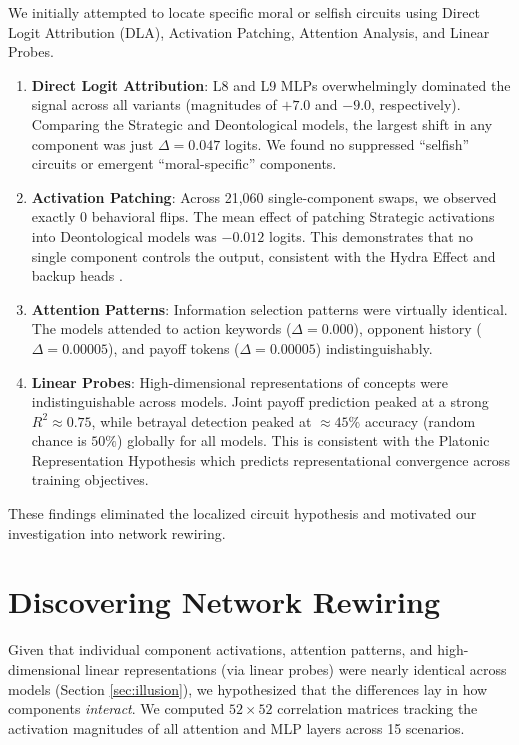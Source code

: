 \documentclass[11pt, letterpaper]{article}
\begin{document}
We initially attempted to locate specific moral or selfish circuits using Direct Logit Attribution (DLA), Activation Patching, Attention Analysis, and Linear Probes.
\begin{enumerate}
    \item \textbf{Direct Logit Attribution}: L8 and L9 MLPs overwhelmingly dominated the signal across all variants (magnitudes of $+7.0$ and $-9.0$, respectively). Comparing the Strategic and Deontological models, the largest shift in any component was just $\Delta=0.047$ logits. We found no suppressed ``selfish'' circuits or emergent ``moral-specific'' components.
    \item \textbf{Activation Patching}: Across 21,060 single-component swaps, we observed exactly 0 behavioral flips. The mean effect of patching Strategic activations into Deontological models was $-0.012$ logits. This demonstrates that no single component controls the output, consistent with the Hydra Effect \citep{mcgrath2023hydra} and backup heads \citep{wang2022interpretability}.
    \item \textbf{Attention Patterns}: Information selection patterns were virtually identical. The models attended to action keywords ($\Delta=0.000$), opponent history ($\Delta=0.00005$), and payoff tokens ($\Delta=0.00005$) indistinguishably.
    \item \textbf{Linear Probes}: High-dimensional representations of concepts were indistinguishable across models. Joint payoff prediction peaked at a strong $R^2 \approx 0.75$, while betrayal detection peaked at $\approx 45\%$ accuracy (random chance is $50\%$) globally for all models. This is consistent with the Platonic Representation Hypothesis \citep{huh2024platonic} which predicts representational convergence across training objectives.
\end{enumerate}
These findings eliminated the localized circuit hypothesis and motivated our investigation into network rewiring.

\section{Discovering Network Rewiring}

Given that individual component activations, attention patterns, and high-dimensional linear representations (via linear probes) were nearly identical across models (Section \ref{sec:illusion}), we hypothesized that the differences lay in how components \textit{interact}. We computed $52 \times 52$ correlation matrices tracking the activation magnitudes of all attention and MLP layers across 15 scenarios.
\end{document}

